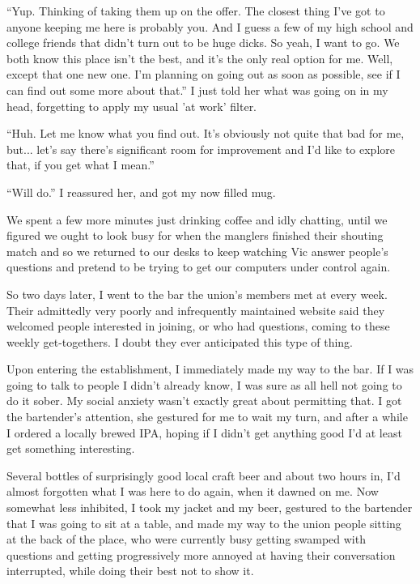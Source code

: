 ``Yup. Thinking of taking them up on the offer. The closest thing I've got to
anyone keeping me here is probably you. And I guess a few of my high school and
college friends that didn't turn out to be huge dicks. So yeah, I want to go. We
both know this place isn't the best, and it's the only real option for me. Well,
except that one new one. I'm planning on going out as soon as possible, see if I
can find out some more about that.'' I just told her what was going on in my
head, forgetting to apply my usual 'at work' filter.

``Huh. Let me know what you find out. It's obviously not quite that bad for me,
but... let's say there's significant room for improvement and I'd like to
explore that, if you get what I mean.''

``Will do.'' I reassured her, and got my now filled mug.

We spent a few more minutes just drinking coffee and idly chatting, until we
figured we ought to look busy for when the manglers finished their shouting
match and so we returned to our desks to keep watching Vic answer people's
questions and pretend to be trying to get our computers under control again.

\spacer

So two days later, I went to the bar the union's members met at every week.
Their admittedly very poorly and infrequently maintained website said they
welcomed people interested in joining, or who had questions, coming to these
weekly get-togethers. I doubt they ever anticipated this type of thing.

Upon entering the establishment, I immediately made my way to the bar. If I was
going to talk to people I didn't already know, I was sure as all hell not going
to do it sober. My social anxiety wasn't exactly great about permitting that. I
got the bartender's attention, she gestured for me to wait my turn, and after a
while I ordered a locally brewed IPA, hoping if I didn't get anything good I'd
at least get something interesting.

\spacer

Several bottles of surprisingly good local craft beer and about two hours in,
I'd almost forgotten what I was here to do again, when it dawned on me. Now
somewhat less inhibited, I took my jacket and my beer, gestured to the bartender
that I was going to sit at a table, and made my way to the union people sitting
at the back of the place, who were currently busy getting swamped with questions
and getting progressively more annoyed at having their conversation interrupted,
while doing their best not to show it.

